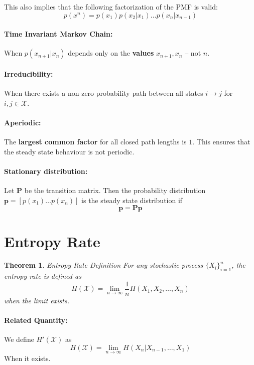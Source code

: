 \documentclass[a4paper,12pt]{report}
\newtheorem{theorem}{Theorem}
\begin{document}
This also implies that the following factorization of the PMF is valid: 
\begin{equation}
	p(x^n) = p(x_1) p(x_2 | x_1) \dots p(x_n | x_{n-1})
\end{equation}



\paragraph{Time Invariant Markov Chain: } When $p(x_{n+1} | x_n)$ depends only
on the \textbf{values} $x_{n+1}, x_n$ -- not $n$. 

\paragraph{Irreducibility: } When there exists a non-zero probability path
between all states $i\to j$ for $i,j\in \mathcal X$.

\paragraph{Aperiodic: } The \textbf{largest common factor} for all closed path
lengths is $1$. This ensures that the steady state behaviour is not periodic.

\paragraph{Stationary distribution: } Let $\mathbf P$ be the transition matrix.
Then the probability distribution $\mathbf p = [p(x_1) \dots p(x_n)]$ is the
steady state distribution if 
\begin{equation}
	\mathbf p = \mathbf P \mathbf p
\end{equation}



\section{Entropy Rate}

\begin{theorem}{Entropy Rate Definition}
For any stochastic process $\{X_i\}_{i=1}^n$, the entropy rate is defined as 
\begin{equation}
	H(\mathcal X) = \lim_{n\to \infty}\frac{1}{n} H(X_1, X_2, \dots, X_n)
\end{equation}
when the limit exists.
\end{theorem}


\paragraph{Related Quantity: } We define $H'(\mathcal X)$ as 
\begin{equation}
	H(\mathcal X) = \lim_{n\to \infty}H(X_n | X_{n-1}, \dots, X_1)
\end{equation}
When it exists. 
\end{document}
